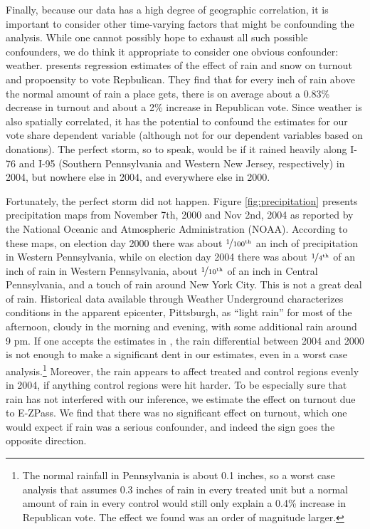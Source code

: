 
Finally, because our data has a high degree of geographic correlation, it is important to consider other time-varying factors that might be confounding the analysis. While one cannot possibly hope to exhaust all such possible confounders, we do think it appropriate to consider one obvious confounder: weather. \textcite{Gomez2007} presents regression estimates of the effect of rain and snow on turnout and propoensity to vote Repbulican. They find that for every inch of rain above the normal amount of rain a place gets, there is on average about a 0.83\% decrease in turnout and about a 2\% increase in Republican vote. Since weather is also spatially correlated, it has the potential to confound the estimates for our vote share dependent variable (although not for our dependent variables based on donations). The perfect storm, so to speak, would be if it rained heavily along I-76 and I-95 (Southern Pennsylvania and Western New Jersey, respectively) in 2004, but nowhere else in 2004, and everywhere else in 2000. 

Fortunately, the perfect storm did not happen. Figure \ref{fig:precipitation} presents precipitation maps from November 7th, 2000 and Nov 2nd, 2004 as reported by the National Oceanic and Atmospheric Administration (NOAA). According to these maps, on election day 2000 there was about $\nicefrac{1}{100^{\mathrm{th}}}$ an inch of precipitation in Western Pennsylvania, while on election day 2004 there was about $\nicefrac{1}{4^{\mathrm{th}}}$ of an inch of rain in Western Pennsylvania, about $\nicefrac{1}{10^{\mathrm{th}}}$ of an inch in Central Pennsylvania, and a touch of rain around New York City. This is not a great deal of rain. Historical data available through Weather Underground characterizes conditions in the apparent epicenter, Pittsburgh, as ``light rain'' for most of the afternoon, cloudy in the morning and evening, with some additional rain around 9 pm. If one accepts the estimates in \textcite{Gomez2007}, the rain differential between 2004 and 2000 is not enough to make a significant dent in our estimates, even in a worst case analysis.\footnote{The normal rainfall in Pennsylvania is about 0.1 inches, so a worst case analysis that assumes 0.3 inches of rain in every treated unit but a normal amount of rain in every control would still only explain a 0.4\% increase in Republican vote. The effect we found was an order of magnitude larger. }  Moreover, the rain appears to affect treated and control regions evenly in 2004, if anything control regions were hit harder. To be especially sure that rain has not interfered with our inference, we estimate the effect on turnout due to E-ZPass. We find that there was no significant effect on turnout, which one would expect if rain was a serious confounder, and indeed the sign goes the opposite direction.

